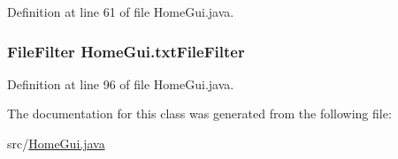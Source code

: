 Definition at line 61 of file Home\-Gui.\-java.

\hypertarget{class_home_gui_af20bf1a94a96e4f53e1f66337a257ce3}{
\subsubsection[{txt\-File\-Filter}]{\setlength{\rightskip}{0pt plus 5cm}File\-Filter {\bf Home\-Gui.\-txt\-File\-Filter}}}\label{class_home_gui_af20bf1a94a96e4f53e1f66337a257ce3}


Definition at line 96 of file Home\-Gui.\-java.



The documentation for this class was generated from the following file\-:\begin{DoxyCompactItemize}
\item 
src/\hyperlink{_home_gui_8java}{Home\-Gui.\-java}\end{DoxyCompactItemize}
